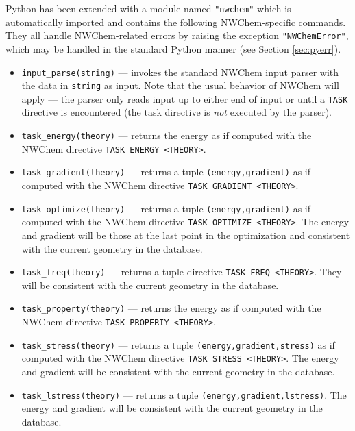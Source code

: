 Python has been extended with a module named \verb+"nwchem"+ which is
automatically imported and contains the following NWChem-specific
commands.  They all handle NWChem-related errors by raising the
exception \verb+"NWChemError"+, which may be handled in the standard
Python manner (see Section \ref{sec:pyerr}). 
\begin{itemize}
\item \verb+input_parse(string)+ --- invokes the standard NWChem input
parser with the data in \verb+string+ as input.  Note that the usual
behavior of NWChem will apply --- the parser only reads input up to
either end of input or until a \verb+TASK+ directive is encountered
(the task directive is {\em not} executed by the parser).

\item \verb+task_energy(theory)+ --- returns the energy as if computed
with the NWChem directive \verb+TASK ENERGY <THEORY>+.

\item \verb+task_gradient(theory)+ --- returns a tuple
\verb+(energy,gradient)+ as if computed with the NWChem
directive \verb+TASK GRADIENT <THEORY>+.

\item \verb+task_optimize(theory)+ --- returns a tuple
\verb+(energy,gradient)+ as if computed with the NWChem
directive \verb+TASK OPTIMIZE <THEORY>+.  The energy and gradient
will be those at the last point in the optimization and consistent
with the current geometry in the database.

\item \verb+task_freq(theory)+ --- returns a tuple
directive \verb+TASK FREQ <THEORY>+.  They will be consistent
with the current geometry in the database. 

\item \verb+task_property(theory)+ --- returns the energy
as if computed with the NWChem
directive \verb+TASK PROPERIY <THEORY>+.

\item \verb+task_stress(theory)+ --- returns a tuple
\verb+(energy,gradient,stress)+ as if computed with the NWChem
directive \verb+TASK STRESS <THEORY>+.  The energy and gradient
will be consistent with the current geometry in the database.

\item \verb+task_lstress(theory)+ --- returns a tuple
\verb+(energy,gradient,lstress)+.  The energy and gradient
will be consistent with the current geometry in the database.


\end{itemize}
